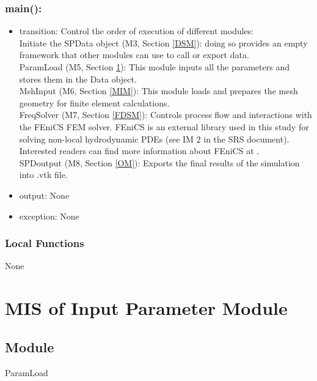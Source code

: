 \documentclass[12pt, titlepage]{article}
\begin{document}
	\subsubsection*{main():} \begin{itemize} \item transition: Control the order of
		execution of different modules:\\ \subitem Initiate the SPData object (M3,
		Section \ref{DSM}): doing so provides an empty framework that other modules can
		use to call or export data. \\ \subitem ParamLoad (M5, Section \ref{IPM}): This
		module inputs all the parameters and stores them in the Data object.\\
		
		\subitem MshInput (M6, Section \ref{MIM}): This module loads and prepares the
		mesh geometry for finite element calculations.\\
		
		\subitem FreqSolver (M7, Section \ref{FDSM}): Controls process flow and
		interactions with the FEniCS FEM solver. FEniCS is an external library used in
		this study for solving non-local hydrodynamic PDEs (see IM 2 in the SRS
		document). Interested readers can find more information about FEniCS at
		\cite{alnaes2015fenics,logg2012finite}.\\
		
		\subitem SPDoutput (M8, Section \ref{OM}): Exports the final results of the
		simulation into .vtk file.
		
		\item output: None \item exception: None \end{itemize}
	
	
	\subsubsection{Local Functions}
	
	None
	
	\newpage %
	\section{MIS of Input Parameter Module} \label{IPM}
	
	\subsection{Module} ParamLoad
	
\end{document}
